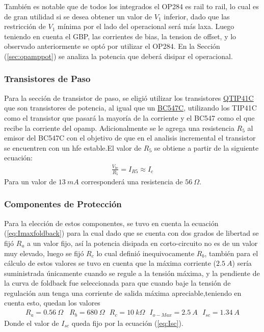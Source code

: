 También es notable que de todos los integrados el OP284 es rail to rail, lo cual es de gran utilidad si se desea obtener un valor de $V_1$ inferior, dado que las restricción de $V_1$ mínima por el lado del operacional será más laxa. Luego teniendo en cuenta el GBP, las corrientes de bias, la tension de offset, y lo observado anteriormente se optó por utilizar el OP284. En la Sección (\ref{sec:opamppot}) se analiza la potencia que deberá disipar el operacional.
\subsubsection{Transistores de Paso}
Para la sección de transistor de paso, se eligió utilizar los transistores \href{https://pdf1.alldatasheet.com/datasheet-pdf/view/532914/FAIRCHILD/TIP31C.html}{QTIP41C} que son transistores de potencia, al igual que un \href{https://pdf1.alldatasheet.com/datasheet-pdf/view/2895/MOTOROLA/BC547C.html}{BC547C}, utilizando los TIP41C como el transistor que pasará la mayoría de la corriente y el BC547 como el que recibe la corriente del opamp.
Adicionalmente se le agrega una resistencia $R_5$ al emisor del BC547C con el objetivo de que en el analisis incremental el transistor se encuentren con un hfe estable.El valor de $R_5$ se obtiene a partir de la siguiente ecuación:
\begin{align}
\frac{V_{be}}{R_5}=I_{R5}\approx I_c
\end{align}
Para un valor de $13 \ mA$ corresponderá una resistencia de $56 \ \Omega$.
\subsubsection{Componentes de Protección}

Para la elección de estos componentes, se tuvo en cuenta la ecuación (\ref{eq:Imaxfoldback}) para la cual dado que se cuenta con dos grados de libertad se fijó $R_a$ a un valor fijo, así la potencia disipada en corto-circuito no es de un valor muy elevado, luego se fijó  $R_c$ lo cual definió inequivocamente $R_b$, también para el cálculo de estos valores se tuvo en cuenta que la máxima corriente ($2.5 \ A$) sería suministrada únicamente cuando se regule a la tensión máxima, y la pendiente de la curva de foldback fue seleccionada para que cuando baje la tensión de regulación aun tenga una corriente de salida máxima apreciable,teniendo en cuenta esto, quedan los valores
\begin{align}
R_a=0.56 \ \Omega  \ \ \ \ R_b=680 \ \Omega \ \ \ R_c=10 \ k\Omega \ \ \ I_{o-Max}=2.5 \ A \ \ \ I_{sc}= 1.34 \ A
\end{align}
Donde el valor de $I_{sc}$ queda fijo por la ecuación (\ref{eq:Isc}).

